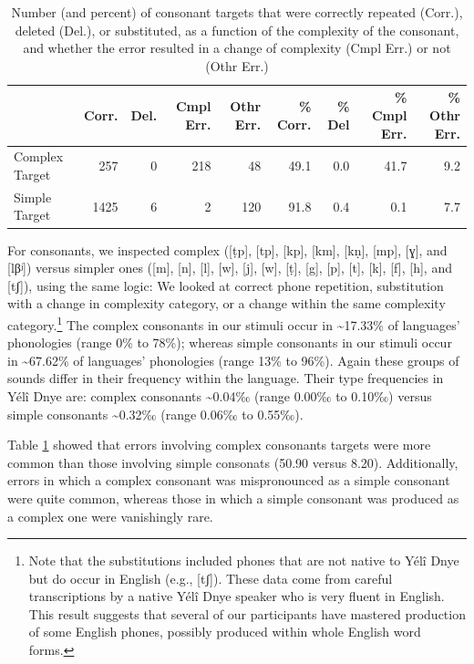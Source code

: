 \documentclass[english,,man,floatsintext]{apa6}
\begin{document}
\begin{table}

\caption{\label{tab:tab-c}Number (and percent) of consonant targets that were correctly repeated (Corr.), deleted (Del.), or substituted, as a function of the complexity of the consonant, and whether the error resulted in a change of complexity (Cmpl Err.) or not (Othr Err.)}
\centering
\begin{tabular}[t]{lrrrrrrrr}
\toprule
  & Corr. & Del. & Cmpl Err. & Othr Err. & \% Corr. & \% Del & \% Cmpl Err. & \% Othr Err.\\
\midrule
Complex Target & 257 & 0 & 218 & 48 & 49.1 & 0.0 & 41.7 & 9.2\\
Simple Target & 1425 & 6 & 2 & 120 & 91.8 & 0.4 & 0.1 & 7.7\\
\bottomrule
\end{tabular}
\end{table}

For consonants, we inspected complex ({[}ṭp{]}, {[}tp{]}, {[}kp{]}, {[}km{]}, {[}kṇ{]}, {[}mp{]}, {[}ɣ{]}, and {[}lβʲ{]}) versus simpler ones ({[}m{]}, {[}n{]}, {[}l{]}, {[}w{]}, {[}j{]}, {[}w{]}, {[}ṭ{]}, {[}g{]}, {[}p{]}, {[}t{]}, {[}k{]}, {[}f{]}, {[}h{]}, and {[}tʃ{]}), using the same logic: We looked at correct phone repetition, substitution with a change in complexity category, or a change within the same complexity category.\footnote{Note that the substitutions included phones that are not native to Yélî Dnye but do occur in English (e.g., {[}tʃ{]}). These data come from careful transcriptions by a native Yélî Dnye speaker who is very fluent in English. This result suggests that several of our participants have mastered production of some English phones, possibly produced within whole English word forms.}
The complex consonants in our stimuli occur in \textasciitilde{}17.33\% of languages' phonologies (range 0\% to 78\%);
whereas simple consonants in our stimuli occur in \textasciitilde{}67.62\% of languages' phonologies (range 13\% to 96\%).
Again these groups of sounds differ in their frequency within the language. Their type frequencies in Yélî Dnye are: complex consonants \textasciitilde{}0.04‰ (range 0.00‰ to 0.10‰) versus simple consonants \textasciitilde{}0.32‰ (range 0.06‰ to 0.55‰).

Table \ref{tab:tab-c} showed that errors involving complex consonants targets were more common than those involving simple consonats (50.90 versus 8.20). Additionally, errors in which a complex consonant was mispronounced as a simple consonant were quite common, whereas those in which a simple consonant was produced as a complex one were vanishingly rare.
\end{document}
